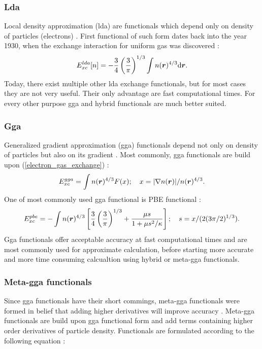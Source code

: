 \documentclass[openany, longbibliography,slovene,a4paper,12pt]{article}
\def\vec#1{\mbox{\boldmath$#1$}}
\newcommand{\dif}{\mathrm{d}}
\begin{document}
\subsubsection{Lda}
Local density approximation (lda) are functionals which depend only on
density of particles (electrons) \cite{challenges_den_fun_theor}.
First functional of such form dates back into
the year 1930, when the exchange interaction for uniform gas was discovered \cite{challenges_den_fun_theor}:
\begin{equation} \label{electron_gas_exchange}
E_{xc}^{lda}[n]=-\frac{3}{4}\left( \frac{3}{\pi} \right)^{1/3}\int n(\vec r)^{4/3} \dif \vec r.
\end{equation}
Today, there exist multiple other lda exchange functionals, but for most cases
they are not very useful. Their only advantage are fast computational times.
For every other purpose gga and hybrid functionals are much better suited.

\subsubsection{Gga}
Generalized gradient approximation (gga) functionals
depend not only on density of particles but also on its gradient \cite{challenges_den_fun_theor}. Most commonly,
gga functionals are build upon (\ref{electron_gas_exchange}) \cite{challenges_den_fun_theor}:
\begin{equation}
  E_{xc}^{gga}=\int n(\vec r)^{4/3}F(x);\quad x=|\nabla n(\vec r)|/n(\vec r)^{4/3}.
\end{equation}
One of most commonly used gga functional is PBE functional
\cite{challenges_den_fun_theor} \cite{challenges_den_fun_theor}:
\begin{equation}
  E_{xc}^{pbe}=-\int  n(\vec r)^{4/3}\left[ \frac{3}{4}\left(\frac{3}{\pi}\right)^{1/3} + \frac{\mu s}{1+ \mu s^2/\kappa} \right]; \quad s=x/(2(3\pi/2)^{1/3}).
\end{equation}
Gga functionals offer acceptable accuracy at fast computational times and are
most commonly used for approximate calculation, before starting more accurate
and more time consuming calcualtion using hybrid or meta-gga functionals.

\subsubsection{Meta-gga functionals}
Since gga functionals have their short commings, meta-gga functionals were formed
in belief that adding higher derivatives will improve accuracy
\cite{challenges_den_fun_theor}. Meta-gga functionals are build upon gga
functional form and add terms containing higher order derivatives of particle
density. Functionals are formulated according to the following equation
\cite{challenges_den_fun_theor}:
\end{document}
